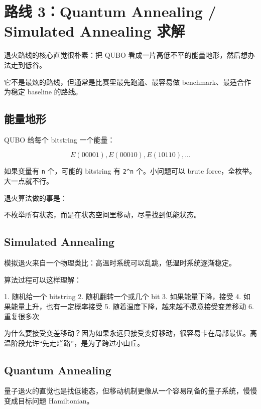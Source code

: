 \documentclass[UTF8,12pt,a4paper]{ctexart}
\begin{document}
\section*{路线 3：Quantum Annealing / Simulated Annealing 求解}

退火路线的核心直觉很朴素：把 QUBO 看成一片高低不平的能量地形，然后想办法走到低谷。

它不是最炫的路线，但通常是比赛里最先跑通、最容易做 benchmark、最适合作为稳定 baseline 的路线。

\subsection*{能量地形}

QUBO 给每个 bitstring 一个能量：

\[
E(00001), E(00010), E(10110), ...
\]

如果变量有 \texttt{n} 个，可能的 bitstring 有 \texttt{2\textasciicircum{}n} 个。小问题可以 brute force，全枚举。大一点就不行。

退火算法做的事是：

\begin{GuideVerbatim}
不枚举所有状态，而是在状态空间里移动，尽量找到低能状态。
\end{GuideVerbatim}

\subsection*{Simulated Annealing}

模拟退火来自一个物理类比：高温时系统可以乱跳，低温时系统逐渐稳定。

算法过程可以这样理解：

\begin{GuideVerbatim}
1. 随机给一个 bitstring
2. 随机翻转一个或几个 bit
3. 如果能量下降，接受
4. 如果能量上升，也有一定概率接受
5. 随着温度下降，越来越不愿意接受变差移动
6. 重复很多次
\end{GuideVerbatim}

为什么要接受变差移动？因为如果永远只接受变好移动，很容易卡在局部最优。高温阶段允许“先走烂路”，是为了跨过小山丘。

\subsection*{Quantum Annealing}

量子退火的直觉也是找低能态，但移动机制更像从一个容易制备的量子系统，慢慢变成目标问题 Hamiltonian。
\end{document}
